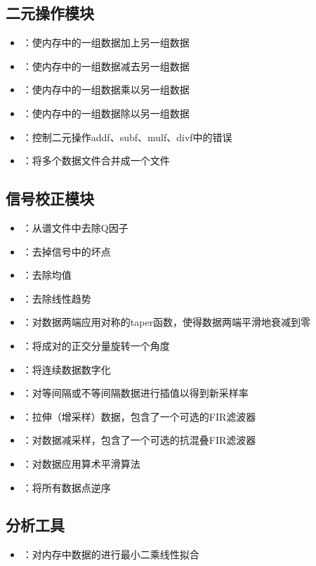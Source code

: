 \subsection*{二元操作模块}
\begin{itemize}
\item {}：使内存中的一组数据加上另一组数据
\item {}：使内存中的一组数据减去另一组数据
\item {}：使内存中的一组数据乘以另一组数据
\item {}：使内存中的一组数据除以另一组数据
\item {}：控制二元操作addf、subf、mulf、divf中的错误
\item {}：将多个数据文件合并成一个文件
\end{itemize}

\subsection*{信号校正模块}
\begin{itemize}
\item {}：从谱文件中去除Q因子
\item {}：去掉信号中的坏点
\item {}：去除均值
\item {}：去除线性趋势
\item {}：对数据两端应用对称的taper函数，使得数据两端平滑地衰减到零
\item {}：将成对的正交分量旋转一个角度
\item {}：将连续数据数字化
\item {}：对等间隔或不等间隔数据进行插值以得到新采样率
\item {}：拉伸（增采样）数据，包含了一个可选的FIR滤波器
\item {}：对数据减采样，包含了一个可选的抗混叠FIR滤波器
\item {}：对数据应用算术平滑算法
\item {}：将所有数据点逆序
\end{itemize}

\subsection*{分析工具}
\begin{itemize}
\item {}：对内存中数据的进行最小二乘线性拟合
\end{itemize}

\newpage
